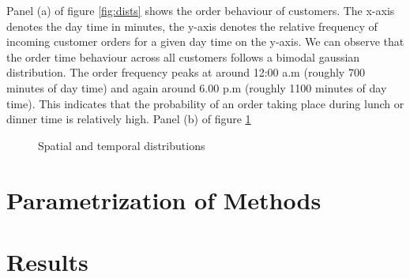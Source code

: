 Panel (a) of figure \ref{fig:dists} shows the order behaviour of customers. The x-axis denotes the day time in minutes, the y-axis denotes the relative frequency of incoming customer orders for a given day time on the y-axis. We can observe that the order time behaviour across all customers follows a bimodal gaussian distribution. The order frequency peaks at around 12:00 a.m (roughly 700 minutes of day time) and again around 6.00 p.m (roughly 1100 minutes of day time). This indicates that the probability of an order taking place during lunch or dinner time is relatively high.  
Panel (b) of figure \ref{fig:prepdelay} 
\begin{figure}[h]
	\centering
	\caption{Spatial and temporal distributions}
	\label{fig:prepdelay}
\end{figure}
 
\section{Parametrization of Methods}

\section{Results}








